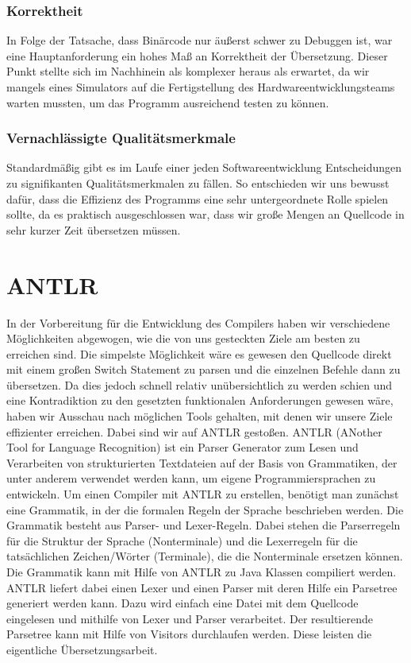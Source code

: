 \documentclass[paper=a4,fontsize=12pt,twocolumn]{scrreprt}
\begin{document}
\subsubsection{Korrektheit}
In Folge der Tatsache, dass Binärcode nur äußerst schwer zu Debuggen ist, war eine Hauptanforderung ein hohes Maß an Korrektheit der Übersetzung.
Dieser Punkt stellte sich im Nachhinein als komplexer heraus als erwartet, da wir mangels eines Simulators auf die Fertigstellung des Hardwareentwicklungsteams warten mussten, um das Programm ausreichend testen zu können. %

\subsubsection{Vernachlässigte Qualitätsmerkmale}
Standardmäßig gibt es im Laufe einer jeden Softwareentwicklung Entscheidungen zu signifikanten Qualitätsmerkmalen zu fällen.
So entschieden wir uns bewusst dafür, dass die Effizienz des Programms eine sehr untergeordnete Rolle spielen sollte, da es praktisch ausgeschlossen war, dass wir große Mengen an Quellcode in sehr kurzer Zeit übersetzen müssen.

\section{ANTLR}
In der Vorbereitung für die Entwicklung des Compilers haben wir verschiedene Möglichkeiten abgewogen, wie die von uns gesteckten Ziele am besten zu erreichen sind.
Die simpelste Möglichkeit wäre es gewesen den Quellcode direkt mit einem großen Switch Statement zu parsen und die einzelnen Befehle dann zu übersetzen.
Da dies jedoch schnell relativ unübersichtlich zu werden schien und eine Kontradiktion zu den gesetzten funktionalen Anforderungen gewesen wäre, haben wir Ausschau nach möglichen Tools gehalten, mit denen wir unsere Ziele effizienter erreichen.
Dabei sind wir auf ANTLR gestoßen.
ANTLR (ANother Tool for Language Recognition) ist ein Parser Generator zum Lesen und Verarbeiten von strukturierten Textdateien auf der Basis von Grammatiken, der unter anderem verwendet werden kann, um eigene Programmiersprachen zu entwickeln.
Um einen Compiler mit ANTLR zu erstellen, benötigt man zunächst eine Grammatik, in der die formalen Regeln der Sprache beschrieben werden.
Die Grammatik besteht aus Parser- und Lexer-Regeln.
Dabei stehen die Parserregeln für die Struktur der Sprache (Nonterminale) und die Lexerregeln für die tatsächlichen Zeichen/Wörter (Terminale), die die Nonterminale ersetzen können.
Die Grammatik kann mit Hilfe von ANTLR zu Java Klassen compiliert werden.
ANTLR liefert dabei einen Lexer und einen Parser mit deren Hilfe ein Parsetree generiert werden kann.
Dazu wird einfach eine Datei mit dem Quellcode eingelesen und mithilfe von Lexer und Parser verarbeitet.
Der resultierende Parsetree kann mit Hilfe von Visitors durchlaufen werden.
Diese leisten die eigentliche Übersetzungsarbeit.
\end{document}
